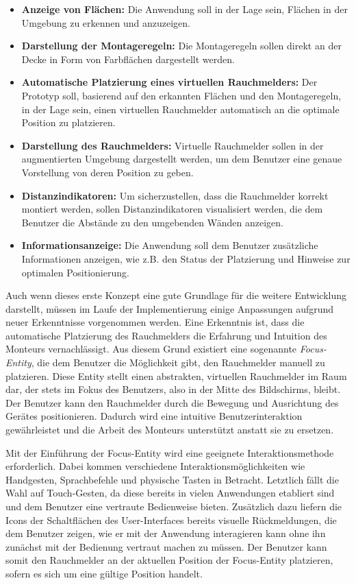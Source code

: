 \begin{itemize}
    \item \textbf{Anzeige von Flächen:} Die Anwendung soll in der Lage sein, Flächen in der Umgebung zu erkennen und anzuzeigen.
    \item \textbf{Darstellung der Montageregeln:} Die Montageregeln sollen direkt an der Decke in Form von Farbflächen dargestellt werden.
    \item \textbf{Automatische Platzierung eines virtuellen Rauchmelders:} Der Prototyp soll, basierend auf den erkannten Flächen und den Montageregeln, in der Lage sein, einen virtuellen Rauchmelder automatisch an die optimale Position zu platzieren.
    \item \textbf{Darstellung des Rauchmelders:} Virtuelle Rauchmelder sollen in der augmentierten Umgebung dargestellt werden, um dem Benutzer eine genaue Vorstellung von deren Position zu geben.
    \item \textbf{Distanzindikatoren:} Um sicherzustellen, dass die Rauchmelder korrekt montiert werden, sollen Distanzindikatoren visualisiert werden, die dem Benutzer die Abstände zu den umgebenden Wänden anzeigen.
    \item \textbf{Informationsanzeige:} Die Anwendung soll dem Benutzer zusätzliche Informationen anzeigen, wie z.B. den Status der Platzierung und Hinweise zur optimalen Positionierung.
\end{itemize}

Auch wenn dieses erste Konzept eine gute Grundlage für die weitere Entwicklung darstellt, müssen im Laufe der Implementierung einige Anpassungen aufgrund neuer Erkenntnisse vorgenommen werden. Eine Erkenntnis ist, dass die automatische Platzierung des Rauchmelders die Erfahrung und Intuition des Monteurs vernachlässigt. Aus diesem Grund existiert eine sogenannte \emph{Focus-Entity}, die dem Benutzer die Möglichkeit gibt, den Rauchmelder manuell zu platzieren. Diese Entity stellt einen abstrakten, virtuellen Rauchmelder im Raum dar, der stets im Fokus des Benutzers, also in der Mitte des Bildschirms, bleibt. Der Benutzer kann den Rauchmelder durch die Bewegung und Ausrichtung des Gerätes positionieren. Dadurch wird eine intuitive Benutzerinteraktion gewährleistet und die Arbeit des Monteurs unterstützt anstatt sie zu ersetzen.

Mit der Einführung der Focus-Entity wird eine geeignete Interaktionsmethode erforderlich. Dabei kommen verschiedene Interaktionsmöglichkeiten wie Handgesten, Sprachbefehle und physische Tasten in Betracht. Letztlich fällt die Wahl auf Touch-Gesten, da diese bereits in vielen Anwendungen etabliert sind und dem Benutzer eine vertraute Bedienweise bieten. Zusätzlich dazu liefern die Icons der Schaltflächen des User-Interfaces bereits visuelle Rückmeldungen, die dem Benutzer zeigen, wie er mit der Anwendung interagieren kann ohne ihn zunächst mit der Bedienung vertraut machen zu müssen. Der Benutzer kann somit den Rauchmelder an der aktuellen Position der Focus-Entity platzieren, sofern es sich um eine gültige Position handelt.

